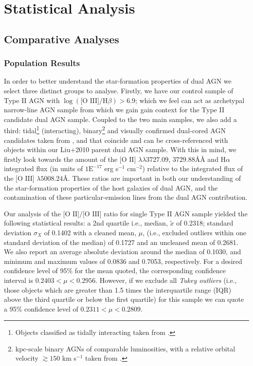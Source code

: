 \section{Statistical Analysis}
\subsection{Comparative Analyses}
\subsubsection{Population Results}

In order to better understand the star-formation properties of dual AGN we select three distinct groups to analyse. Firstly, we have our control sample of Type II AGN with $\log{(\text{[O III]}/\text{H}\beta)}>{6.9}$; which we feel can act as archetypal narrow-line AGN sample from which we gain gain context for the Type II candidate dual AGN sample. Coupled to the two main samples, we also add a third: tidal\footnote{\tiny{Objects classified as tidally interacting taken from \cite{Liu_2011}.}} (interacting), binary\footnote{\tiny{kpc-scale binary AGNs of comparable luminosities, with a relative orbital velocity $\gtrsim{150}$ km s$^{-1}$ taken from \cite{Shen_Liu_Greene_Strauss_2011}.}} and visually confirmed dual-cored AGN candidates taken from \cite{Ge_Hu_Wang_Bai_Zhang_2012}, and that coincide and can be cross-referenced with objects within our Liu+2010 parent dual AGN sample. With this in mind, we firstly look towards the amount of the $\text{[O II]}$ $\lambda\lambda$$3727.09$, $3729.88$\AA\AA{} and $\text{H}\alpha$ integrated flux (in units of $1\text{E}^{-17}$ erg s$^{-1}$ cm$^{-2}$) relative to the integrated flux of the $\text{[O III]}$ $\lambda$$5008.24$\AA. These ratios are important in both our understanding of the star-formation properties of the host galaxies of dual AGN, and the contamination of these particular-emission lines from the dual AGN contribution.

Our analysis of the $\text{[O II]/[O III]}$ ratio for single Type II AGN sample yielded the following statistical results: a 2nd quartile i.e., median, $\tilde{x}$ of 0.2318; standard deviation $\sigma_{X}$ of 0.1402 with a cleaned mean, $\mu$, (i.e., excluded outliers within one standard deviation of the median) of 0.1727 and an uncleaned mean of 0.2681. We also report an average absolute deviation around the median of 0.1030, and minimum and maximum values of 0.0836 and 0.7053, respectively. For a desired confidence level of 95\% for the mean quoted, the corresponding confidence interval is ${0.2403}<{\mu}<{0.2956}$. However, if we exclude all \textit{Tukey outliers} (i.e., those objects which are greater than 1.5 times the interquartile range (IQR) above the third quartile or below the first quartile) for this sample we can quote a 95\% confidence level of ${0.2311}<{\mu}<{0.2809}$.

